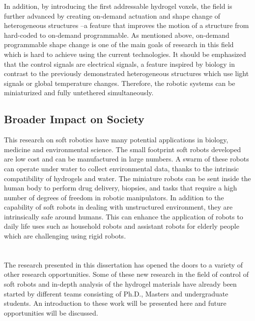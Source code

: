 In addition, by introducing the first addressable hydrogel voxels,  the field is further advanced by creating on-demand actuation and shape change of heterogeneous structures --a feature that improves the motion of a structure from hard-coded to on-demand programmable. As mentioned above, on-demand programmable shape change is one of the main goals of research in this field which is hard to achieve using the current technologies. It should be emphasized that the control signals are electrical signals, a feature inspired by biology in contrast to the previously demonstrated heterogeneous structures which use light signals or global temperature changes. Therefore, the robotic systems can be miniaturized and fully untethered simultaneously.
\subsection{Broader Impact on Society}
This research on soft robotics have many potential applications in biology, medicine and environmental science. The small footprint soft robots developed are low cost and can be manufactured in large numbers. A swarm of these robots can operate under water to collect environmental data, thanks to the intrinsic compatibility of hydrogels and water. The miniature robots can be sent inside the human body to perform drug delivery, biopsies, and tasks that require a high number of degrees of freedom in robotic manipulators.
In addition to the capability of soft robots in dealing with unstructured environment, they are intrinsically safe around humans. This can enhance the application of robots to daily life uses such as household robots and assistant robots for elderly people which are challenging using rigid robots.
\section{}
The research presented in this dissertation has opened the doors to a variety of other research opportunities. Some of these new research in the field of control of soft robots and in-depth analysis of the hydrogel materials  have already been started by different teams consisting of Ph.D., Masters and undergraduate students. An introduction to these work will be presented here and future opportunities will be discussed.
